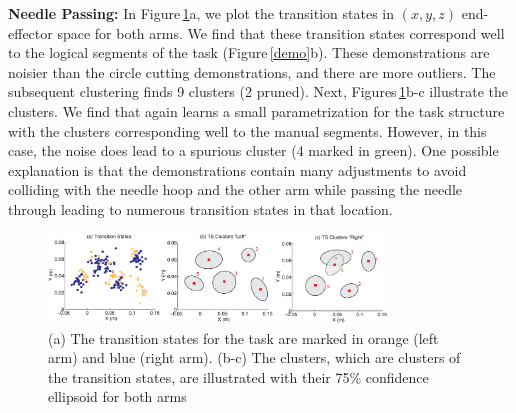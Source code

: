 
\noindent\textbf{Needle Passing: } 
In Figure\,\ref{exp:np}a, we plot the transition states in $(x,y,z)$ end-effector space for both arms.
We find that these transition states correspond well to the logical segments of the task (Figure\,\ref{demo}b).
These demonstrations are noisier than the circle cutting demonstrations, and there are more outliers.
The subsequent clustering finds 9 clusters (2 pruned).
Next, Figures\,\ref{exp:np}b-c illustrate the \tsc clusters.
We find that again \tsc learns a small parametrization for the task structure with the clusters corresponding well to the manual segments.
However, in this case, the noise does lead to a spurious cluster (4 marked in green).
One possible explanation is that the demonstrations contain many adjustments to avoid colliding with the needle hoop and the other arm while passing the needle through leading to numerous transition states in that location.

\begin{figure}[ht!]
\centering
    \includegraphics[width=0.8\textwidth]{tsc-experiments/new_needle_passing2.eps}
    \vspace{-0.7em}
    \caption{(a) The transition states for the task are marked in orange (left arm) and blue (right arm). (b-c) The \tsc clusters, which are clusters of the transition states, are illustrated with their 75\% confidence ellipsoid for both arms}
    \label{exp:np}
    \vspace{-0.5em}
\end{figure}



\vspace{0.5em}

